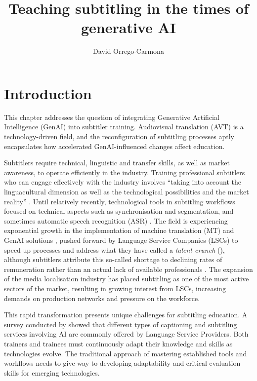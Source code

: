 \documentclass[output=paper]{langscibook}
\author{David Orrego-Carmona\orcid{}\affiliation{University of Warwick, United Kingdom and University of the Free State, South Africa}}
\title{Teaching subtitling in the times of generative AI}
\begin{document}
\maketitle

\section{Introduction}

This chapter addresses the question of integrating Generative Artificial Intelligence (GenAI) into subtitler training. Audiovisual translation (AVT) is a technology-driven field, and the reconfiguration of subtitling processes aptly encapsulates how accelerated GenAI-influenced changes affect education.

Subtitlers require technical, linguistic and transfer skills, as well as market awareness, to operate efficiently in the industry. Training professional subtitlers who can engage effectively with the industry involves “taking into account the linguacultural dimension as well as the technological possibilities and the market reality” \citep[62]{díaz-cintas2021subtitling}. Until relatively recently, technological tools in subtitling workflows focused on technical aspects such as synchronisation and segmentation, and sometimes automatic speech recognition (ASR) \citep{georgakopoulou2020faces}. The field is experiencing exponential growth in the implementation of machine translation (MT) and GenAI solutions \citep{slator2024proguide}, pushed forward by Language Service Companies  (LSCs) to speed up processes and address what they have called a \textit{talent crunch} (\citealt{estopace2017talentcrunch, papercup2022translator}), although subtitlers attribute this so-called shortage to declining rates of remuneration rather than an actual lack of available professionals \citep{orrego-carmona2024placing}. The expansion of the media localisation industry has placed subtitling as one of the most active sectors of the market, resulting in growing interest from LSCs, increasing demands on production networks and pressure on the workforce.

This rapid transformation presents unique challenges for subtitling education. A survey conducted by \citet{slator2024proguide} showed that different types of captioning and subtitling services involving AI are commonly offered by Language Service Providers. Both trainers and trainees must continuously adapt their knowledge and skills as technologies evolve. The traditional approach of mastering established tools and workflows needs to give way to developing adaptability and critical evaluation skills for emerging technologies. 
\end{document}
